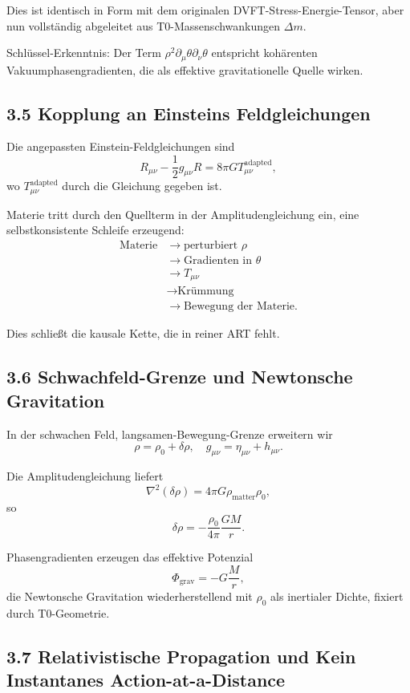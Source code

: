 	Dies ist identisch in Form mit dem originalen DVFT-Stress-Energie-Tensor, aber nun vollständig abgeleitet aus T0-Massenschwankungen $\Delta m$.
	
	Schlüssel-Erkenntnis: Der Term $\rho^2 \partial_\mu \theta \partial_\nu \theta$ entspricht kohärenten Vakuumphasengradienten, die als effektive gravitationelle Quelle wirken.
	
	\subsection{3.5 Kopplung an Einsteins Feldgleichungen}
	
	Die angepassten Einstein-Feldgleichungen sind
	\[
	R_{\mu\nu} - \frac{1}{2} g_{\mu\nu} R = 8\pi G T_{\mu\nu}^{\text{adapted}},
	\]
	wo $T_{\mu\nu}^{\text{adapted}}$ durch die Gleichung gegeben ist.
	
	Materie tritt durch den Quellterm in der Amplitudengleichung ein, eine selbstkonsistente Schleife erzeugend:
\[
\begin{aligned}
	\text{Materie} &\to \text{perturbiert } \rho \\
	&\to \text{Gradienten in } \theta \\
	&\to T_{\mu\nu} \\
	&\to \text{Krümmung} \\
	&\to \text{Bewegung der Materie}.
\end{aligned}
\]

	
	Dies schließt die kausale Kette, die in reiner ART fehlt.
	
	\subsection{3.6 Schwachfeld-Grenze und Newtonsche Gravitation}
	
	In der schwachen Feld, langsamen-Bewegung-Grenze erweitern wir
	\[
	\rho = \rho_0 + \delta \rho, \quad g_{\mu\nu} = \eta_{\mu\nu} + h_{\mu\nu}.
	\]
	
	Die Amplitudengleichung liefert
	\[
	\nabla^2 (\delta \rho) = 4\pi G \rho_{\text{matter}} \rho_0,
	\]
	so
	\[
	\delta \rho = -\frac{\rho_0}{4\pi} \frac{GM}{r}.
	\]
	
	Phasengradienten erzeugen das effektive Potenzial
	\[
	\Phi_{\text{grav}} = -G \frac{M}{r},
	\]
	die Newtonsche Gravitation wiederherstellend mit $\rho_0$ als inertialer Dichte, fixiert durch T0-Geometrie.
	
	\subsection{3.7 Relativistische Propagation und Kein Instantanes Action-at-a-Distance}
	
